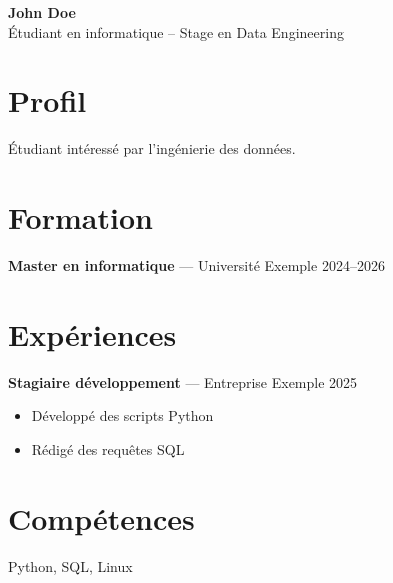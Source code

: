 \documentclass[11pt,a4paper]{article}
\begin{document}
\begin{center}
{\LARGE\bfseries John Doe }\\[3pt]
Étudiant en informatique – Stage en Data Engineering
\end{center}

\section*{Profil}
Étudiant intéressé par l'ingénierie des données.

\section*{Formation}

\textbf{Master en informatique} --- Université Exemple \hfill 2024–2026\par


\section*{Expériences}

\textbf{Stagiaire développement} --- Entreprise Exemple \hfill 2025\par
\begin{itemize}

\item Développé des scripts Python

\item Rédigé des requêtes SQL

\end{itemize}


\section*{Compétences}
Python, SQL, Linux
\end{document}
